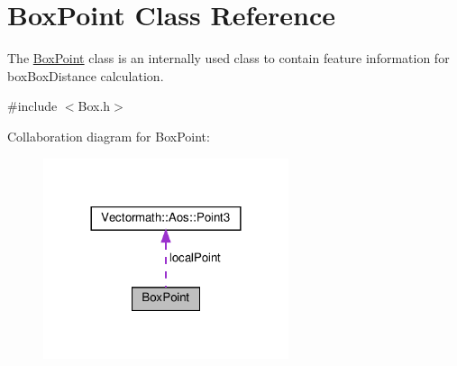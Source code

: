 \hypertarget{classBoxPoint}{}\section{Box\+Point Class Reference}
\label{classBoxPoint}


The \hyperlink{classBoxPoint}{Box\+Point} class is an internally used class to contain feature information for box\+Box\+Distance calculation.  




{\ttfamily \#include $<$Box.\+h$>$}



Collaboration diagram for Box\+Point\+:
\nopagebreak
\begin{figure}[H]
\begin{center}
\leavevmode
\includegraphics[width=204pt]{classBoxPoint__coll__graph}
\end{center}
\end{figure}
